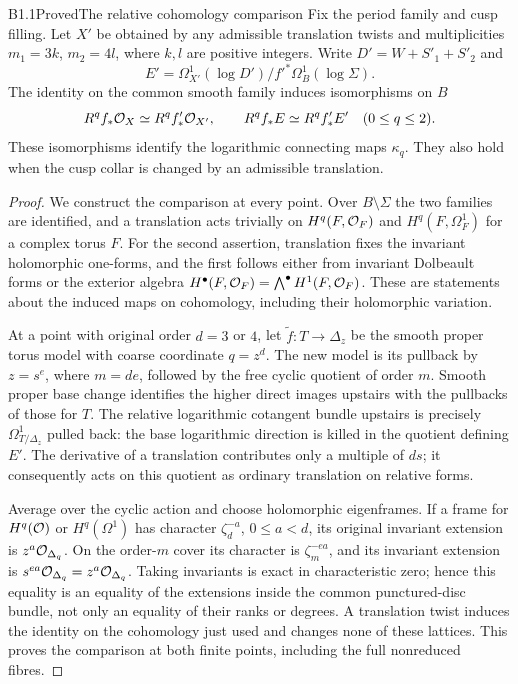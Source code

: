 \begin{claim}{B1.1}{Proved}{The relative cohomology comparison}
Fix the period family and cusp filling. Let $X'$ be obtained by any
admissible translation twists and multiplicities $m_1=3k$, $m_2=4l$,
where $k,l$ are positive integers. Write $D'=W+S'_1+S'_2$ and
\[
E'=\Omega^1_{X'}(\log D')/f'^*\Omega^1_B(\log\Sigma).
\]
The identity on the common smooth family induces isomorphisms on $B$
\[
R^qf_*\mathcal O_X\simeq R^qf'_*\mathcal O_{X'},\qquad
R^qf_*E\simeq R^qf'_*E'\quad(0\le q\le2).
\]
These isomorphisms identify the logarithmic connecting maps $\kappa_q$.
They also hold when the cusp collar is changed by an admissible translation.
\end{claim}
\begin{proof}
We construct the comparison at every point. Over $B\setminus\Sigma$
the two families are identified, and a translation acts trivially on
$H^q(F,\mathcal O_F)$ and $H^q(F,\Omega^1_F)$ for a complex torus $F$.
For the second assertion, translation fixes the invariant holomorphic
one-forms, and the first follows either from invariant Dolbeault forms
or the exterior algebra $H^\bullet(F,\mathcal O_F)=\bigwedge^\bullet H^1(F,\mathcal O_F)$.
These are statements about the induced maps on cohomology, including
their holomorphic variation.

At a point with original order $d=3$ or $4$, let
$\widetilde f:T\to\Delta_z$ be the smooth proper torus model with
coarse coordinate $q=z^d$. The new model is its pullback by $z=s^e$,
where $m=de$, followed by the free cyclic quotient of order $m$.
Smooth proper base change identifies the higher direct images upstairs
with the pullbacks of those for $T$. The relative logarithmic cotangent
bundle upstairs is precisely $\Omega^1_{T/\Delta_z}$ pulled back:
the base logarithmic direction is killed in the quotient defining $E'$.
The derivative of a translation contributes only a multiple of $ds$;
it consequently acts on this quotient as ordinary translation on relative forms.

Average over the cyclic action and choose holomorphic eigenframes.
If a frame for $H^q(\mathcal O)$ or $H^q(\Omega^1)$ has character
$\zeta_d^{-a}$, $0\le a<d$, its original invariant extension is
$z^a\mathcal O_{\Delta_q}$. On the order-$m$ cover its character is
$\zeta_m^{-ea}$, and its invariant extension is
$s^{ea}\mathcal O_{\Delta_q}=z^a\mathcal O_{\Delta_q}$.
Taking invariants is exact in characteristic zero; hence this equality
is an equality of the extensions inside the common punctured-disc
bundle, not only an equality of their ranks or degrees. A translation
twist induces the identity on the cohomology just used and changes none
of these lattices. This proves the comparison at both finite points,
including the full nonreduced fibres.


\end{proof}

